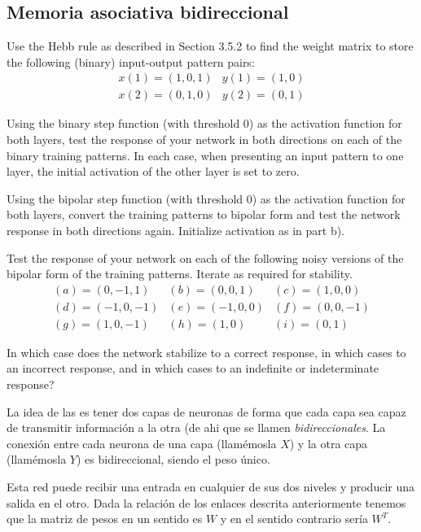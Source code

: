 \subsection{Memoria asociativa bidireccional}\label{sec:MemoriaAsociativaBidireccional}

\begin{problem}[10]
\ppart Use the Hebb rule as described in Section 3.5.2 to find the weight matrix to store
the following (binary) input-output pattern pairs:
\[\begin{array}{ll}
x(1)=(1,0,1) & y(1)=(1,0)\\
x(2) = (0,1,0) & y(2) = (0,1)
\end{array}\]

\ppart Using the binary step function (with threshold 0) as the activation function for both layers, test the response of your network in both directions on each of the
binary training patterns. In each case, when presenting an input pattern to one
layer, the initial activation of the other layer is set to zero.

\ppart Using the bipolar step function (with threshold 0) as the activation function for both layers, convert the training patterns to bipolar form and test the network response in both directions again. Initialize activation as in part b).

\ppart Test the response of your network on each of the following noisy versions of the bipolar form of the training patterns. Iterate as required for stability.
\[\begin{array}{lll}
(a)=(0,-1,1) & (b)=(0,0,1) & (c) = (1,0,0)\\
(d)=(-1,0,-1) & (e) = (-1,0,0) & (f) = (0,0,-1) \\
(g) = (1,0,-1) & (h)=(1,0) & (i) = (0,1)
\end{array}\]

\ppart  In which case does the network stabilize to a correct response, in which cases to an incorrect response, and in which cases to an indefinite or indeterminate response?

\solution

La idea de las  es tener dos capas de neuronas de forma que cada capa sea capaz de transmitir información a la otra (de ahi que se llamen \emph{bidireccionales}. La conexión entre cada neurona de una capa (llamémosla $X$) y la otra capa (llamémosla $Y$) es bidireccional, siendo el peso único.

Esta red puede recibir una entrada en cualquier de sus dos niveles y producir una salida en el otro. Dada la relación de los enlaces descrita anteriormente tenemos que la matriz de pesos en un sentido es $W$ y en el sentido contrario sería $W^T$.


\end{problem}
